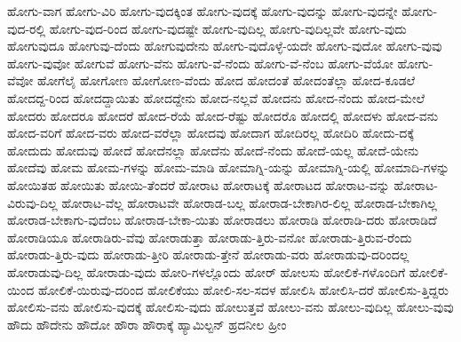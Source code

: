 {ಹೋಗು-ವಾಗ
ಹೋಗು-ವಿರಿ
ಹೋಗು-ವುದಕ್ಕಿಂತ
ಹೋಗು-ವುದಕ್ಕೆ
ಹೋಗು-ವುದನ್ನು
ಹೋಗು-ವುದನ್ನೇ
ಹೋಗು-ವುದ-ರಲ್ಲಿ
ಹೋಗು-ವುದ-ರಿಂದ
ಹೋಗು-ವುದಷ್ಟೇ
ಹೋಗು-ವುದಿಲ್ಲ
ಹೋಗು-ವುದಿಲ್ಲವೇ
ಹೋಗು-ವುದು
ಹೋಗುವುದೂ
ಹೋಗುವು-ದೆಂದು
ಹೋಗುವುದೇನು
ಹೋಗು-ವುದೊಳ್ಳೆ-ಯದೇ
ಹೋಗು-ವುದೋ
ಹೋಗು-ವುವು
ಹೋಗು-ವುವೋ
ಹೋಗುವೆ
ಹೋಗು-ವೆನು
ಹೋಗು-ವೆ-ನೆಂದು
ಹೋಗು-ವೆ-ನೆಂಬ
ಹೋಗು-ವೆಯೋ
ಹೋಗು-ವೆವೋ
ಹೋಗೆಲೈ
ಹೋಗೋಣ
ಹೋಗೋಣ-ವೆಂದು
ಹೋದ
ಹೋದಂತೆ
ಹೋದಂತೆಲ್ಲಾ
ಹೋದ-ಕೂಡಲೆ
ಹೋದದ್ದ-ರಿಂದ
ಹೋದದ್ದಾಯಿತು
ಹೋದದ್ದೇನು
ಹೋದ-ನಲ್ಲವೆ
ಹೋದನು
ಹೋದ-ನೆಂದು
ಹೋದ-ಮೇಲೆ
ಹೋದರು
ಹೋದರೂ
ಹೋದರೆ
ಹೋದ-ರೆಯೆ
ಹೋದ-ರೆಷ್ಟು
ಹೋದರೊ
ಹೋದಲ್ಲಿ
ಹೋದಳು
ಹೋದ-ವನು
ಹೋದ-ವರಿಗೆ
ಹೋದ-ವರು
ಹೋದ-ವರೆಲ್ಲಾ
ಹೋದವು
ಹೋದಾಗ
ಹೋದಿರಲ್ಲ
ಹೋದಿರಿ
ಹೋದು-ದಕ್ಕೆ
ಹೋದುದು
ಹೋದುವು
ಹೋದೆ
ಹೋದೆನಲ್ಲಾ
ಹೋದೆನು
ಹೋದೆ-ನೆಂದು
ಹೋದೆ-ಯಲ್ಲ
ಹೋದೆ-ಯೇನು
ಹೋದೆವು
ಹೋಮ
ಹೋಮ-ಗಳನ್ನು
ಹೋಮ-ಮಾಡಿ
ಹೋಮಾಗ್ನಿ-ಯನ್ನು
ಹೋಮಾಗ್ನಿ-ಯಲ್ಲಿ
ಹೋಮಾದಿ-ಗಳನ್ನು
ಹೋಯಿತಹ
ಹೋಯಿತು
ಹೋಯಿ-ತೆಂದರೆ
ಹೋರಾಟ
ಹೋರಾಟಕ್ಕೆ
ಹೋರಾಟದ
ಹೋರಾಟ-ವನ್ನು
ಹೋರಾಟ-ವಿರುವು-ದಿಲ್ಲ
ಹೋರಾಟ-ವೆಲ್ಲ
ಹೋರಾಟವೇ
ಹೋರಾಡ-ಬಲ್ಲ
ಹೋರಾಡ-ಬೇಕಾಗಿರ-ಲಿಲ್ಲ
ಹೋರಾಡ-ಬೇಕಾಗಿಲ್ಲ
ಹೋರಾಡ-ಬೇಕಾಗು-ವುದೆಂಬ
ಹೋರಾಡ-ಬೇಕಾ-ಯಿತು
ಹೋರಾಡಲು
ಹೋರಾಡಿ
ಹೋರಾಡಿ-ದರು
ಹೋರಾಡಿದೆ
ಹೋರಾಡಿಯೂ
ಹೋರಾಡಿರು-ವೆವು
ಹೋರಾಡುತ್ತಾ
ಹೋರಾಡು-ತ್ತಿರು-ವನೋ
ಹೋರಾಡು-ತ್ತಿರುವ-ರೆಂದು
ಹೋರಾಡು-ತ್ತಿರು-ವುದು
ಹೋರಾಡು-ತ್ತೀರಿ
ಹೋರಾಡು-ತ್ತೇನೆ
ಹೋರಾಡು-ವರು
ಹೋರಾಡುವು-ದರಿಂದಲ್ಲ
ಹೋರಾಡುವು-ದಿಲ್ಲ
ಹೋರಾಡು-ವುದು
ಹೋರಿ-ಗಳಲ್ಲೊಂದು
ಹೋರ್
ಹೋಲಸು
ಹೋಲಿಕೆ-ಗಳೊಂದಿಗೆ
ಹೋಲಿಕೆ-ಯಿಂದ
ಹೋಲಿಕೆ-ಯಿರುವು-ದರಿಂದ
ಹೋಲಿಕೆಯು
ಹೋಲಿ-ಸಲ-ಸದಳ
ಹೋಲಿಸಿ
ಹೋಲಿಸಿ-ದರೆ
ಹೋಲಿಸು-ತ್ತಿದ್ದರು
ಹೋಲಿಸು-ವನು
ಹೋಲಿಸು-ವುದಕ್ಕೆ
ಹೋಲಿಸು-ವುದು
ಹೋಲುತ್ತವೆ
ಹೋಲು-ವನು
ಹೋಲು-ವುದಿಲ್ಲ
ಹೋಲು-ವುವು
ಹೌದು
ಹೌದೇನು
ಹೌದೋ
ಹೌರಾ
ಹೌರಾಕ್ಕೆ
ಹ್ಯಾಮಿಲ್ಟನ್
ಹ್ರದನೀಲ
ಹ್ರೀಂ
}
